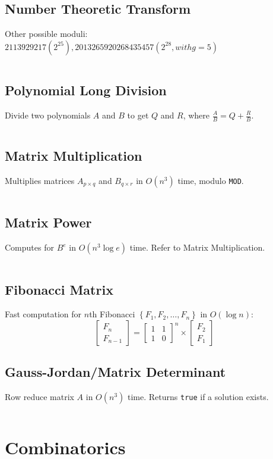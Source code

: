\documentclass[8pt,a4paper,landscape,oneside]{amsart}
\newcommand{\code}[1]{\inputminted[fontsize=\normalsize,baselinestretch=1]{cpp}{_code/#1}}
\begin{document}
\begin{multicols*}{3}
  \subsection{Number Theoretic Transform}
    Other possible moduli: $2 113 929 217 (2^{25}), 2 013 265 920 268 435 457 (2^{28}, with g = 5)$
    \code{algebra/ntt.cpp}
  \subsection{Polynomial Long Division}
    Divide two polynomials $A$ and $B$ to get $Q$ and $R$, where $\frac{A}{B} = Q + \frac{R}{B}$.
    \code{algebra/poly-long-div.cpp}
  \subsection{Matrix Multiplication}
    Multiplies matrices $A_{p\times q}$ and $B_{q\times r}$ in $O(n^3)$ time, modulo \texttt{MOD}.
    \code{algebra/matmul.java}
  \subsection{Matrix Power}
    Computes for $B^e$ in $O(n^3 \log e)$ time. Refer to Matrix Multiplication.
    \code{algebra/matpow.java}
  \subsection{Fibonacci Matrix}
    Fast computation for $n$th Fibonacci $\left\{F_1,F_2,\ldots,F_n \right\}$ in $O(\log n)$:
    \[
    \begin{bmatrix}
        F_n \\
        F_{n-1}
    \end{bmatrix}
    =
    \begin{bmatrix}
        1 & 1 \\
        1 & 0
    \end{bmatrix}^n
    \times
    \begin{bmatrix}
        F_2 \\
        F_1
    \end{bmatrix}
    \]
  \subsection{Gauss-Jordan/Matrix Determinant}
    Row reduce matrix $A$ in $O(n^3)$ time. Returns \texttt{true} if a solution exists.
    \code{algebra/gauss-jordan.java}
\section{Combinatorics}

\end{multicols*}
\end{document}
